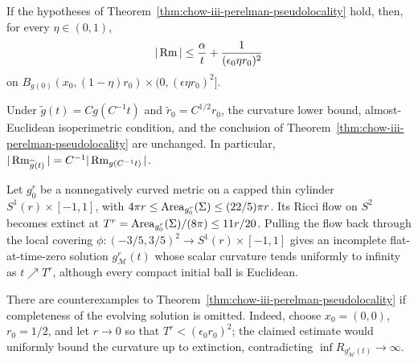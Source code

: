 \begin{corollary}
\label{cor:chow-iii-interior-curvature-estimate}


If the hypotheses of Theorem~\ref{thm:chow-iii-perelman-pseudolocality} hold,
then, for every \(\eta\in(0,1)\),
\[
|\operatorname{Rm}|\le\frac\alpha t+\frac1{(\epsilon_0\eta r_0)^2}
\]
on \(B_{g(0)}(x_0,(1-\eta)r_0)\times(0,(\epsilon\eta r_0)^2]\).
\end{corollary}

\begin{remark}
\label{rem:chow-iii-pseudolocality-scale-invariance}

Under \(\widetilde g(t)=Cg(C^{-1}t)\) and \(\widetilde r_0=C^{1/2}r_0\),
the curvature lower bound, almost-Euclidean isoperimetric condition, and
the conclusion of Theorem~\ref{thm:chow-iii-perelman-pseudolocality} are
unchanged.  In particular, \(|\operatorname{Rm}_{\widetilde g(t)}|=C^{-1}|\operatorname{Rm}_{g(C^{-1}t)}|\).
\end{remark}

\begin{example}
\label{ex:chow-iii-topping-incomplete-solution}

Let \(g_0^r\) be a nonnegatively curved metric on a capped thin cylinder
\(S^1(r)\times[-1,1]\), with
\(4\pi r\le\operatorname{Area}_{g_0^r}(\Sigma)\le(22/5)\pi r\).  Its Ricci flow on
\(S^2\) becomes extinct at \(T^r=\operatorname{Area}_{g_0^r}(\Sigma)/(8\pi)\le11r/20\).
Pulling the flow back through the local covering
\(\phi:(-3/5,3/5)^2\to S^1(r)\times[-1,1]\) gives an incomplete flat-at-time-zero
solution \(g_{\mathcal M}^r(t)\) whose scalar curvature tends uniformly to
infinity as \(t\nearrow T^r\), although every compact initial ball is Euclidean.
\end{example}

\begin{theorem}[Topping]
\label{thm:chow-iii-topping-counterexample}


There are counterexamples to Theorem~\ref{thm:chow-iii-perelman-pseudolocality}
if completeness of the evolving solution is omitted.  Indeed, choose
\(x_0=(0,0)\), \(r_0=1/2\), and let \(r\to0\) so that \(T^r<
(\epsilon_0r_0)^2\); the claimed estimate would uniformly bound the curvature
up to extinction, contradicting \(\inf R_{g_{\mathcal M}^r(t)}\to\infty\).
\end{theorem}

